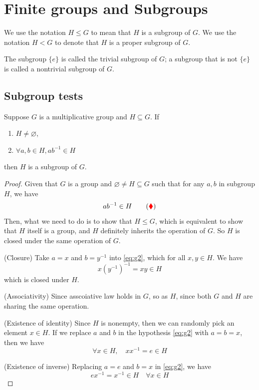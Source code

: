 \section{Finite groups and Subgroups}

\begin{remark}
    We use the notation $H \leq G$ to mean that $H$ is a subgroup of $G$. We use the notation $H < G$ to denote that 
$H$ is a proper subgroup of $G$. 

The subgroup $\{ e \}$ is called the trivial subgroup of $G$; a subgroup that is not 
$\{ e \}$ is called a nontrivial subgroup of $G$.
\end{remark}

\subsection{Subgroup tests}

\begin{theorem}
    Suppose $G$ is a multiplicative group and $H \subseteq G$. If 
    \begin{enumerate}
        \item $H \neq \varnothing$,
        \item $\forall a, b \in H, ab^{-1} \in H$
    \end{enumerate}
    then $H$ is a subgroup of $G$. 
\end{theorem}
\begin{proof}
    Given that $G$ is a group and $\varnothing \neq H \subseteq G$ such that for any $a, b$ in subgroup $H$, we have 
    \begin{equation*}
        ab^{-1} \in H   \label{eq:g2} \tag{{\color{red} $\blacklozenge$}}
    \end{equation*}
    Then, what we need to do is to show that $H \leq G$, which is equivalent to show that $H$ itself is a group, and $H$ 
    definitely inherits the operation of $G$. So $H$ is closed under the same operation of $G$.

    (Closure) Take $a = x$ and $b = y^{-1}$ into \eqref{eq:g2}, which for all $x, y \in H$. We have 
    \[
        x(y^{-1})^{-1} = xy \in H
    \]
    which is closed under $H$.

    (Associativity) Since asscoiative law holds in $G$, so as $H$, since both $G$ and $H$ are sharing the 
    same operation.
    
    (Existence of identity) Since $H$ is nonempty, then we can randomly pick an element $x \in H$. If we 
    replace $a$ and $b$ in the hypothesis \eqref{eq:g2} with $a = b = x$, then we have 
    \[
        \forall x \in H,\quad xx^{-1} = e \in H
    \]

    (Existence of inverse) Replacing $a = e$ and $b = x$ in \eqref{eq:g2}, we have 
    \[
        ex^{-1} = x^{-1} \in H \quad \forall x \in H 
    \]
\end{proof}

